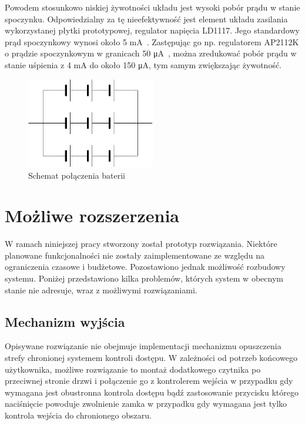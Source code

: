         Powodem stosunkowo niskiej żywotności układu jest wysoki pobór prądu w stanie spoczynku. Odpowiedzialny za tę nieefektywność jest element układu zasilania wykorzystanej płytki prototypowej, regulator napięcia LD1117. Jego standardowy prąd spoczynkowy wynosi około 5 mA~\cite{AMS1117-ds}. Zastępując go np. regulatorem AP2112K o prądzie spoczynkowym w granicach 50 μA~\cite{AP2112K-ds}, można zredukować pobór prądu w stanie uśpienia z 4 mA do około 150 μA, tym samym zwiększając żywotność.

        \begin{figure}[]
            \centering
            \includegraphics[width=0.5\textwidth]{chapters/images/battery_layout.png}
            \caption{Schemat połączenia baterii}
            \label{fig:battery_layout}
        \end{figure}

	\section{Możliwe rozszerzenia}

        W ramach niniejszej pracy stworzony został prototyp rozwiązania. Niektóre planowane funkcjonalności nie zostały zaimplementowane ze względu na ograniczenia czasowe i budżetowe. Pozostawiono jednak możliwość rozbudowy systemu. Poniżej przedstawiono kilka problemów, których system w obecnym stanie nie adresuje, wraz z możliwymi rozwiązaniami.

        \subsection{Mechanizm wyjścia}

            Opisywane rozwiązanie nie obejmuje implementacji mechanizmu opuszczenia strefy chronionej systemem kontroli dostępu. W zależności od potrzeb końcowego użytkownika, możliwe rozwiązanie to montaż dodatkowego czytnika po przeciwnej stronie drzwi i połączenie go z kontrolerem wejścia w przypadku gdy wymagana jest obustronna kontrola dostępu bądź zastosowanie przycisku którego naciśnięcie powoduje zwolnienie zamka w przypadku gdy wymagana jest tylko kontrola wejścia do chronionego obszaru.

